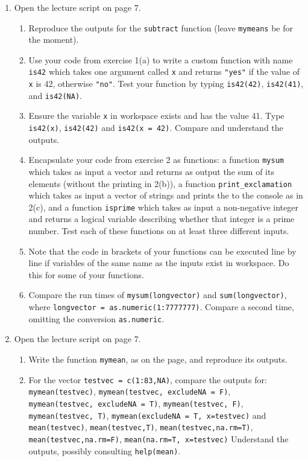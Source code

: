 \begin{enumerate}
\item Open the lecture script on page 7.
\begin{enumerate}
\item Reproduce the outputs for the \texttt{subtract} function (leave \texttt{mymeans} be for the moment).
\item Use your code from exercise 1(a) to write a custom function with name \texttt{is42} which takes one argument called \texttt{x} and returns \texttt{"yes"} if the value of \texttt{x} is 42, otherwise \texttt{"no"}. Test your function by typing \texttt{is42(42)}, \texttt{is42(41)}, and \texttt{is42(NA)}.
\item Ensure the variable \texttt{x} in workspace exists and has the value 41. Type \texttt{is42(x)}, \texttt{is42(42)} and \texttt{is42(x = 42)}. Compare and understand the outputs.
\item Encapsulate your code from exercise 2 as functions: a function \texttt{mysum} which takes as input a vector and returns as output the sum of its elements (without the printing in 2(b)), a function \texttt{print\_exclamation} which takes as input a vector of strings and prints the to the console as in 2(c), and a function \texttt{isprime} which takes as input a non-negative integer and returns a logical variable describing whether that integer is a prime number. Test each of these functions on at least three different inputs.
\item Note that the code in brackets of your functions can be executed line by line if variables of the same name as the inputs exist in workspace. Do this for some of your functions.
\item Compare the run times of \texttt{mysum(longvector)} and \texttt{sum(longvector)}, where \texttt{longvector = as.numeric(1:7777777)}. Compare a second time, omitting the conversion \texttt{as.numeric}.
\end{enumerate}

\item Open the lecture script on page 7.
\begin{enumerate}
\item Write the function \texttt{mymean}, as on the page, and reproduce its outputs.
\item For the vector \texttt{testvec = c(1:83,NA)}, compare the outputs for:\\
 \texttt{mymean(testvec)}, \texttt{mymean(testvec, excludeNA = F)},\\
 \texttt{mymean(testvec, excludeNA = T)}, \texttt{mymean(testvec, F)},\\ 
 \texttt{mymean(testvec, T)}, \texttt{mymean(excludeNA = T, x=testvec)} and\\
 \texttt{mean(testvec)}, \texttt{mean(testvec,T)}, \texttt{mean(testvec,na.rm=T)},\\
 \texttt{mean(testvec,na.rm=F)}, \texttt{mean(na.rm=T, x=testvec)}
 Understand the outputs, possibly consulting \texttt{help(mean)}.
\end{enumerate}


\end{enumerate}

